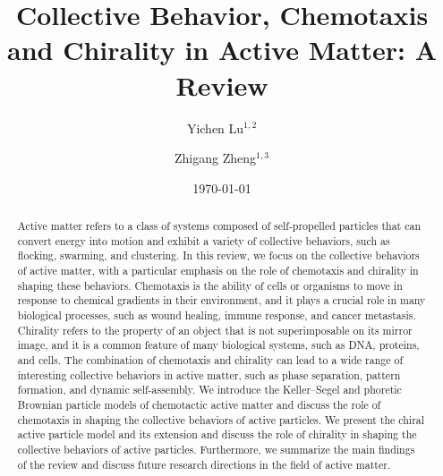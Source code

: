 \documentclass[a4paper, amsfonts, amssymb, amsmath, reprint, showkeys, showpacs, nofootinbib, twoside]{revtex4-2}
\begin{document}
\title{Collective Behavior, Chemotaxis and Chirality in Active Matter: A Review
}

\author{Yichen Lu$^{1,2}$}
\author{Zhigang Zheng$^{1,3}$}


\date{\today} %

\begin{abstract}
    Active matter refers to a class of systems composed of self-propelled particles that can convert energy into motion and exhibit a variety of collective behaviors, such as flocking, swarming, and clustering. In this review, we focus on the collective behaviors of active matter, with a particular emphasis on the role of chemotaxis and chirality in shaping these behaviors. Chemotaxis is the ability of cells or organisms to move in response to chemical gradients in their environment, and it plays a crucial role in many biological processes, such as wound healing, immune response, and cancer metastasis. Chirality refers to the property of an object that is not superimposable on its mirror image, and it is a common feature of many biological systems, such as DNA, proteins, and cells. The combination of chemotaxis and chirality can lead to a wide range of interesting collective behaviors in active matter, such as phase separation, pattern formation, and dynamic self-assembly. We introduce the Keller--Segel and phoretic Brownian particle models of chemotactic active matter and discuss the role of chemotaxis in shaping the collective behaviors of active particles. We present the chiral active particle model and its extension and discuss the role of chirality in shaping the collective behaviors of active particles. Furthermore, we summarize the main findings of the review and discuss future research directions in the field of active matter.
\end{abstract}


\maketitle
\end{document}
